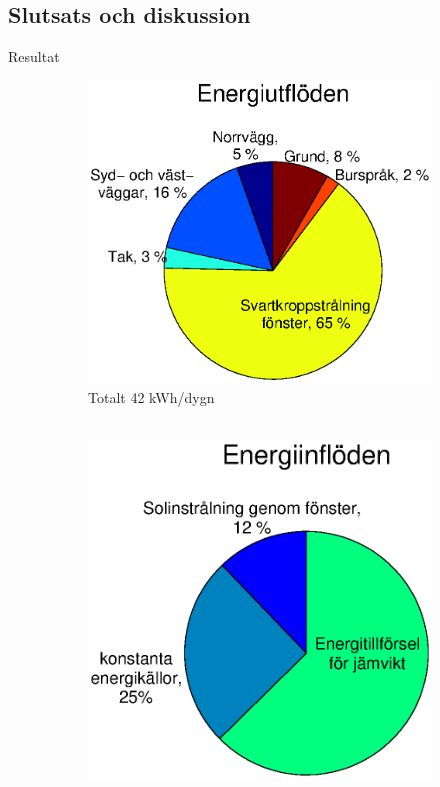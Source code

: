 \subsection{Slutsats och diskussion}

\begin{frame}{Resultat}


\begin{figure}
        \begin{subfigure}[b]{0.55\textwidth}
                \centering
                \includegraphics[width=\textwidth]{images/totalflow_out.eps}
                \caption*{Totalt 42 kWh/dygn \\ ~}
        \end{subfigure}
        \hskip-1.5cm
        \begin{subfigure}[b]{0.55\textwidth}
                \centering
                \includegraphics[width=\textwidth]{images/totalflow_in.eps}

\end{subfigure}
\end{figure}
\end{frame}
